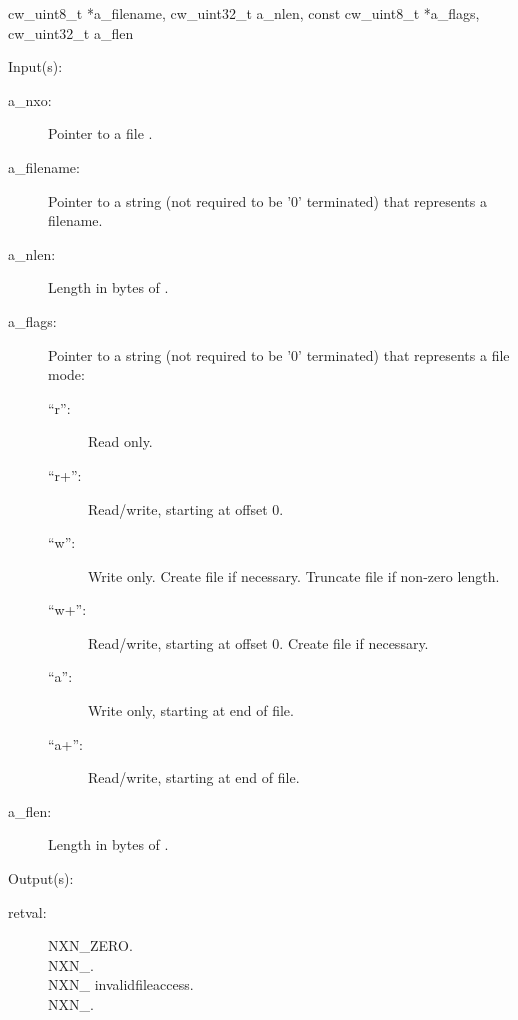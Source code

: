 \begin{capi}
{{cw\_uint8\_t *a\_filename, cw\_uint32\_t a\_nlen, const cw\_uint8\_t *a\_flags,
cw\_uint32\_t a\_flen}}
	\begin{capilist}
	\item[Input(s): ]
		\begin{description}\item[]
		\item[a\_nxo: ]
			Pointer to a file .
		\item[a\_filename: ]
			Pointer to a string (not required to be '{\bs}0'
			terminated) that represents a filename.
		\item[a\_nlen: ]
			Length in bytes of .
		\item[a\_flags: ]
			Pointer to a string (not required to be '{\bs}0'
			terminated) that represents a file mode:
			\begin{description}\item[]
			\item[``r'': ]
				Read only.
			\item[``r+'': ]
				Read/write, starting at offset 0.
			\item[``w'': ]
				Write only.  Create file if necessary.  Truncate
				file if non-zero length.
			\item[``w+'': ]
				Read/write, starting at offset 0.  Create
				file if necessary.
			\item[``a'': ]
				Write only, starting at end of file.
			\item[``a+'': ]
				Read/write, starting at end of file.
			\end{description}
		\item[a\_flen: ]
			Length in bytes of .
		\end{description}
	\item[Output(s): ]
		\begin{description}\item[]
		\item[retval: ]
			\begin{description}\item[]
			\item[NXN\_ZERO.]
			\item[NXN\_.]
			\item[NXN\_
				{invalidfileaccess}.]
			\item[NXN\_.]
			\end{description}
		\end{description}

\end{capilist}
\end{capi}
